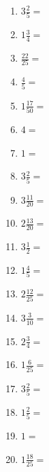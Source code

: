 \documentclass[12pt]{article}
\begin{document}
\begin{enumerate}
\item \large $ 3 \frac{2}{5} = $ \vspace{1.3cm}
\item \large $ 1 \frac{3}{4} = $ \vspace{1.3cm}
\item \large $ \frac{22}{25} = $ \vspace{1.3cm}
\item \large $ \frac{4}{5} = $ \vspace{1.3cm}
\item \large $ 1 \frac{17}{50} = $ \vspace{1.3cm}
\item \large $ 4 = $ \vspace{1.3cm}
\item \large $ 1 = $ \vspace{1.3cm}
\item \large $ 3 \frac{2}{5} = $ \vspace{1.3cm}
\item \large $ 3 \frac{11}{20} = $ \vspace{1.3cm}
\item \large $ 2 \frac{13}{20} = $ \vspace{1.3cm}
\newpage
\item \large $ 3 \frac{1}{2} = $ \vspace{1.5cm}
\item \large $ 1 \frac{4}{5} = $ \vspace{1.5cm}
\item \large $ 2 \frac{12}{25} = $ \vspace{1.5cm}
\item \large $ 3 \frac{3}{10} = $ \vspace{1.5cm}
\item \large $ 2 \frac{3}{4} = $ \vspace{1.5cm}
\item \large $ 1 \frac{6}{25} = $ \vspace{1.5cm}
\item \large $ 3 \frac{2}{5} = $ \vspace{1.5cm}
\item \large $ 1 \frac{2}{5} = $ \vspace{1.5cm}
\item \large $ 1 = $ \vspace{1.5cm}
\item \large $ 1 \frac{18}{25} = $ \vspace{1.5cm}

\end{enumerate}
\end{document}
